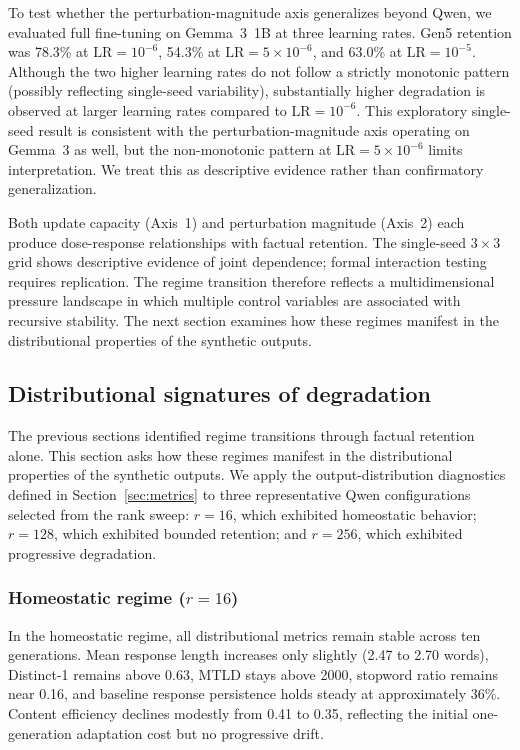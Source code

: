 \documentclass[a4paper,fleqn]{cas-dc}
\newif\ifshowchanges
\newcommand{\rev}[1]{\ifshowchanges{\color{blue}#1}\else{#1}\fi}
\begin{document}
To test whether the perturbation-magnitude axis generalizes beyond Qwen, we
evaluated full fine-tuning on Gemma~3~1B at three learning rates. Gen5 retention
was 78.3\% at $\mathrm{LR}=10^{-6}$, 54.3\% at $\mathrm{LR}=5 \times 10^{-6}$,
and 63.0\% at $\mathrm{LR}=10^{-5}$. Although the two higher learning rates do
not follow a strictly monotonic pattern (possibly reflecting single-seed
variability), substantially higher degradation is observed at larger learning
rates compared to $\mathrm{LR}=10^{-6}$. \rev{This exploratory single-seed result is consistent with the perturbation-magnitude
axis operating on Gemma~3 as well, but the non-monotonic pattern at $\mathrm{LR}=5\times10^{-6}$
limits interpretation. We treat this as descriptive evidence rather than
confirmatory generalization.}

Both update capacity (Axis~1) and perturbation magnitude (Axis~2) each produce
dose-response relationships with factual retention. \rev{The single-seed $3{\times}3$ grid shows descriptive evidence of joint dependence; formal interaction testing requires replication.} The regime transition therefore reflects a
multidimensional pressure landscape in which multiple control variables are
associated with recursive stability. The next section examines how these regimes
manifest in the distributional properties of the synthetic outputs.

\FloatBarrier
\subsection{Distributional signatures of degradation}\label{sec:res_distribution}

The previous sections identified regime transitions through factual retention
alone. This section asks how these regimes manifest in the distributional
properties of the synthetic outputs. We apply the output-distribution diagnostics
defined in Section~\ref{sec:metrics} to three representative Qwen configurations
selected from the rank sweep: $r=16$, which exhibited homeostatic behavior;
$r=128$, which exhibited bounded retention; and $r=256$, which exhibited
progressive degradation.

\subsubsection{Homeostatic regime ($r=16$)}
In the homeostatic regime, all distributional metrics remain stable across ten
generations. Mean response length increases only slightly (2.47 to 2.70 words),
Distinct-1 remains above 0.63, MTLD stays above 2000, stopword ratio remains
near 0.16, and baseline response persistence holds steady at approximately 36\%.
Content efficiency declines modestly from 0.41 to 0.35, reflecting the initial
one-generation adaptation cost but no progressive drift.
\end{document}
